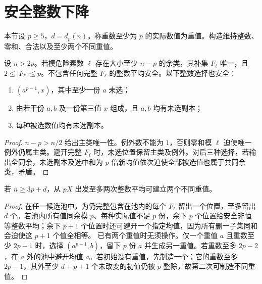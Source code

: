 \section{安全整数下降}\label{sec:descent}
本节设 $p\ge5$，$d=d_p(n)$。称重数至少为 $p$ 的实际数值为重值。构造维持整数、零和、合法以及至少两个不同重值。

\begin{lemma}\label{lem:safety}
设 $n>2p$。若模危险素数 $\ell$ 存在大小至少 $n-p$ 的余类，其补集 $F_\ell$ 唯一，且 $2\le|F_\ell|\le p$。不包含任何完整 $F_\ell$ 的整数平均安全。以下整数选择也安全：
\begin{enumerate}
\item $(a^{p-1},x)$，其中至少一份 $a$ 未选；
\item 由若干份 $a,b$ 及一份第三值 $x$ 组成，且 $a,b$ 均有未选副本；
\item 每种被选数值均有未选副本。
\end{enumerate}
\end{lemma}
\begin{proof}
$n-p>n/2$ 给出主类唯一性。例外数不能为 $1$，否则零和模 $\ell$ 迫使唯一例外仍属主类。避开完整 $F_\ell$ 时，未选位置保留主类及例外。对后三种选择，若输出全同余，未选副本及选中和为 $p$ 倍新均值依次迫使全部被选值也属于共同余类，矛盾。
\end{proof}

\begin{lemma}\label{lem:initialize}
若 $n\ge3p+d$，从 $pX$ 出发至多两次整数平均可建立两个不同重值。
\end{lemma}
\begin{proof}
在任一候选池中，为仍完整包含在池内的每个 $F_\ell$ 留出一个位置，至多留出 $d$ 个。若池内所有值同余模 $p$、每种实际值不足 $p$ 份，余下 $p$ 个位置给安全非恒等整数平均；余下 $p+1$ 个位置时还可避开一个指定均值，因为所有删一子集同和会迫使这 $p+1$ 个值全相等。
已有两个重值时无须操作。仅一个重值 $a$ 且重数至少 $2p-1$ 时，选择 $(a^{p-1},b)$，留下 $p$ 份 $a$ 并生成另一重值。若重数至多 $2p-2$，在 $a$ 外的池中避开均值 $a$。若初始没有重值，先制造一个；它的重数至多 $2p-1$，其外至少 $d+p+1$ 个未改变的初值仍被 $p$ 整除，故第二次可制造不同重值。
\end{proof}

